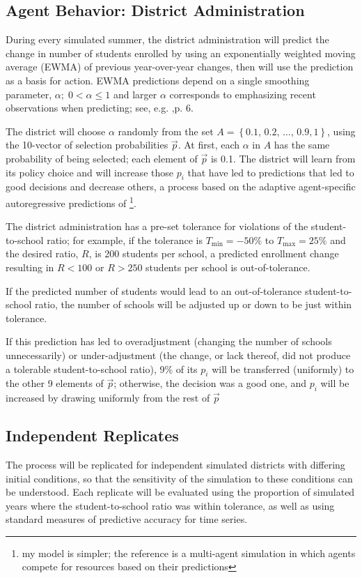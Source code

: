 \documentclass{article}
\begin{document}
\subsection*{Agent Behavior: District Administration}	
During every simulated summer, the district administration will predict the change in number of students enrolled by using an exponentially weighted moving average (EWMA) of previous year-over-year changes, then will use the prediction as a basis for action. EWMA predictions depend on a single smoothing parameter, $\alpha;\; 0<\alpha\leq1$ and larger $\alpha$ corresponds to emphasizing recent observations when predicting; see, e.g.  \cite{snyder1999understanding},p. 6. 

The district will choose $\alpha$ randomly from the set $A = \left\{0.1,\,0.2,\,\dots,\,0.9, 1\right\}$, using the 10-vector of selection probabilities $\vec{p}$. At first, each $\alpha$ in $A$ has the same probability of being selected; each element of $\vec{p}$ is 0.1. The district will learn from its policy choice and will increase those $p_i$ that have led to predictions that led to good decisions and decrease others, a process based on the adaptive agent-specific autoregressive predictions of \cite{fogel1999inductive}\footnote{my model is simpler; the reference is a multi-agent simulation in which agents compete for resources based on their predictions}.

The district administration has a pre-set tolerance for violations of the student-to-school ratio; for example, if the tolerance is $T_\text{min}=-50\%$ to $T_\text{max}=25\%$ and the desired ratio, $R$, is 200 students per school, a predicted enrollment change resulting in $R<100$ or $R>250$ students per school is out-of-tolerance.


If the predicted number of students would lead to an out-of-tolerance student-to-school ratio, the number of schools will be adjusted up or down to be just within tolerance. 

If this prediction has led to overadjustment (changing the number of schools unnecessarily) or under-adjustment (the change, or lack thereof, did not produce a tolerable student-to-school ratio), 9\% of its $p_i$ will be transferred (uniformly) to the other 9 elements of $\vec{p}$; otherwise, the decision was a good one, and $p_i$ will be increased by drawing uniformly from the rest of $\vec{p}$


\subsection*{Independent Replicates}
The process will be replicated for independent simulated districts with differing initial conditions, so that the sensitivity of the simulation to these conditions can be understood. Each replicate will be evaluated using the proportion of simulated years where the student-to-school ratio was within tolerance, as well as using standard measures of predictive accuracy for time series.
\end{document}
